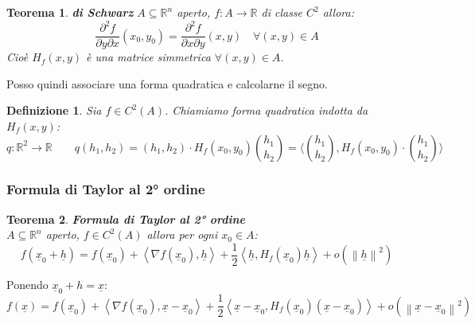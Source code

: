 \documentclass{scrreprt}
\newtheorem{defn}{Definizione}
\newenvironment{definition}{\begin{mdframed}[backgroundcolor=Ivory2]\begin{defn}}{\end{defn}\end{mdframed}}
\newtheorem{teorema}{Teorema}
\newenvironment{thm}{\begin{mdframed}[backgroundcolor=Ivory2]\begin{teorema}}{\end{teorema}\end{mdframed}}
\begin{document}
\begin{thm} \textbf{di Schwarz}
	$A \subseteq \mathbb{R}^n$ aperto, $f: A \to \mathbb{R}$ di classe $C^2$ allora:
	\begin{equation}
		\frac{\partial^2 f}{\partial y \partial x} (x_0, y_0) = \frac{\partial^2 f}{\partial x \partial y} (x, y) \quad \forall (x,y) \in A
	\end{equation}
	Cioè $H_f(x,y)$ è una matrice simmetrica $\forall (x,y) \in A$.
\end{thm}
Posso quindi associare una forma quadratica e calcolarne il segno.

\begin{definition}
	Sia $f \in C^2(A)$. Chiamiamo forma quadratica indotta da $H_f(x,y)$:
	\begin{equation}
		q: \mathbb{R}^2 \to \mathbb{R} \quad \quad q(h_1,h_2) = (h_1, h_2) \cdot H_f(x_0,y_0) \binom{h_1}{h_2} = \langle \binom{h_1}{h_2}, H_f(x_0,y_0) \cdot \binom{h_1}{h_2} \rangle %
	\end{equation}
%
%
\end{definition}


\subsubsection{Formula di Taylor al 2° ordine}
\begin{thm} \textbf{Formula di Taylor al 2° ordine}\\ %
	$A \subseteq \mathbb{R}^n$ aperto, $f \in C^2(A)$  allora per ogni $x_0 \in A$:
	\begin{equation}
		f(\underline{x}_0 + \underline{h}) = f(\underline{x}_0) + \left\langle \nabla f (\underline{x}_0), \underline{h}\right\rangle  + \frac{1}{2} \left\langle \underline{h}, H_f (\underline{x}_0) \underline{h}\right\rangle + o(\left\lVert \underline{h} \right\rVert^2)
	\end{equation}
\end{thm}
Ponendo $\underline{x}_0 + h = \underline{x}$:
\begin{equation}
	f(\underline{x}) = f(\underline{x}_0) + \left\langle \nabla f (\underline{x}_0), \underline{x} - \underline{x}_0\right\rangle  + \frac{1}{2} \left\langle \underline{x} - \underline{x}_0, H_f (\underline{x}_0) (\underline{x} - \underline{x}_0)\right\rangle + o(\left\lVert \underline{x} - \underline{x}_0 \right\rVert^2)
\end{equation}
\end{document}
